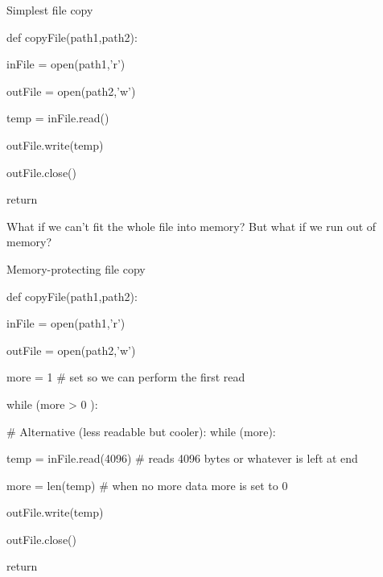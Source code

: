     \begin{recipe}{Simplest file copy}

\begin{example}

def copyFile(path1,path2):



  inFile  = open(path1,'r')

  outFile = open(path2,'w')



    temp = inFile.read()

    outFile.write(temp)



  outFile.close()

  return

\end{example}

\end{recipe}



What if we can't fit the whole file into memory?  But what if we run out of memory?



\begin{recipe}{Memory-protecting file copy}

\begin{example}

def copyFile(path1,path2):



  inFile  = open(path1,'r')

  outFile = open(path2,'w')



  more = 1                    # set so we can perform the first read

  while (more > 0 ):

                      # Alternative (less readable but cooler): while (more):



    temp = inFile.read(4096)  # reads 4096 bytes or whatever is left at end

    more = len(temp)          # when no more data more is set to 0

    outFile.write(temp)



  outFile.close()

  return

\end{example}

\end{recipe}



